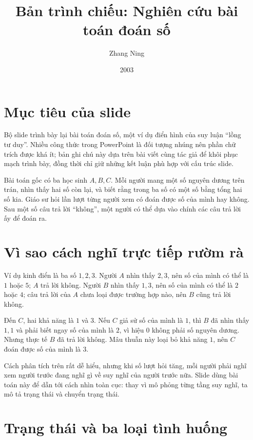 \documentclass[11pt]{article}
\title{Bản trình chiếu: Nghiên cứu bài toán đoán số}
\author{Zhang Ning}
\date{2003}
\begin{document}
\maketitle


\section{Mục tiêu của slide}

Bộ slide trình bày lại bài toán đoán số, một ví dụ điển hình của suy luận
``lồng tư duy''. Nhiều công thức trong PowerPoint là đối tượng nhúng nên phần
chữ trích được khá ít; bản ghi chú này dựa trên bài viết cùng tác giả để
khôi phục mạch trình bày, đồng thời chỉ giữ những kết luận phù hợp với cấu
trúc slide.

Bài toán gốc có ba học sinh \(A,B,C\). Mỗi người mang một số nguyên dương
trên trán, nhìn thấy hai số còn lại, và biết rằng trong ba số có một số bằng
tổng hai số kia. Giáo sư hỏi lần lượt từng người xem có đoán được số của
mình hay không. Sau một số câu trả lời ``không'', một người có thể dựa vào
chính các câu trả lời ấy để đoán ra.

\section{Vì sao cách nghĩ trực tiếp rườm rà}

Ví dụ kinh điển là ba số \(1,2,3\). Người \(A\) nhìn thấy \(2,3\), nên số của
mình có thể là \(1\) hoặc \(5\); \(A\) trả lời không. Người \(B\) nhìn thấy
\(1,3\), nên số của mình có thể là \(2\) hoặc \(4\); câu trả lời của \(A\)
chưa loại được trường hợp nào, nên \(B\) cũng trả lời không.

Đến \(C\), hai khả năng là \(1\) và \(3\). Nếu \(C\) giả sử số của mình là
\(1\), thì \(B\) đã nhìn thấy \(1,1\) và phải biết ngay số của mình là \(2\),
vì hiệu \(0\) không phải số nguyên dương. Nhưng thực tế \(B\) đã trả lời
không. Mâu thuẫn này loại bỏ khả năng \(1\), nên \(C\) đoán được số của mình
là \(3\).

Cách phân tích trên rất dễ hiểu, nhưng khi số lượt hỏi tăng, mỗi người phải
nghĩ xem người trước đang nghĩ gì về suy nghĩ của người trước nữa. Slide dùng
bài toán này để dẫn tới cách nhìn toàn cục: thay vì mô phỏng từng tầng suy
nghĩ, ta mô tả trạng thái và chuyển trạng thái.

\section{Trạng thái và ba loại tình huống}
\end{document}
